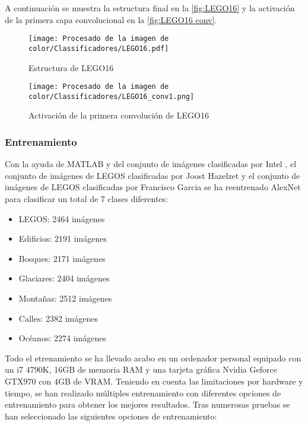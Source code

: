 A continuación se muestra la estructura final en la \autoref{fig:LEGO16} y la activación de la primera capa convolucional en la \autoref{fig:LEGO16 conv}.

\begin{figure}[ht]  %
	\centering
	\texttt{[image: Procesado de la imagen de color/Classificadores/LEGO16.pdf]}
	\caption{Estructura de LEGO16}
	\label{fig:LEGO16}
	\vspace{-5pt}
\end{figure}

\begin{figure}[ht]  %
	\centering
	\texttt{[image: Procesado de la imagen de color/Classificadores/LEGO16\_conv1.png]}
	\caption{Activación de la primera convolución de LEGO16}
	\label{fig:LEGO16 conv}
	\vspace{-5pt}
\end{figure}

\subsubsection*{Entrenamiento}
Con la ayuda de MATLAB y del conjunto de imágenes clasificadas por Intel \citep{IntelDataset}, el conjunto de imágenes de LEGOS clasificadas por Joost Hazelzet \citep{LEGODataset} y el conjunto de imágenes de LEGOS clasificadas por Francisco Garcia \citep{LEGODataset2} se ha reentrenado AlexNet para clasificar un total de 7 clases diferentes:

\begin{itemize}
\item LEGOS: 2464 imágenes
\item Edificios: 2191 imágenes
\item Bosques: 2171 imágenes
\item Glaciares: 2404 imágenes
\item Montañas: 2512 imágenes
\item Calles: 2382 imágenes
\item Océanos: 2274 imágenes
\end{itemize}

Todo el etrenamiento se ha llevado acabo en un ordenador personal equipado con un i7 4790K, 16GB de memoria RAM y una tarjeta gráfica Nvidia Geforce GTX970 con 4GB de VRAM. Teniendo en cuenta las limitaciones por hardware y tiempo, se han realizado múltiples entrenamiento con diferentes opciones de entrenamiento para obtener los mejores resultados. Tras numerosas pruebas se han seleccionado las siguientes opciones de entrenamiento:

